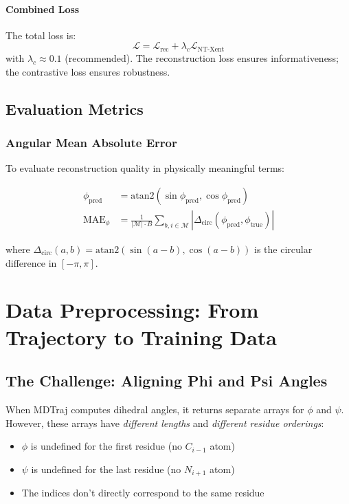 \documentclass[12pt,a4paper]{article}
\begin{document}
\paragraph{Combined Loss}
The total loss is:
\begin{equation}
\mathcal{L} = \mathcal{L}_{\text{rec}} + \lambda_c \mathcal{L}_{\text{NT-Xent}}
\end{equation}
with $\lambda_c \approx 0.1$ (recommended). The reconstruction loss ensures informativeness; the contrastive loss ensures robustness.

\subsection{Evaluation Metrics}

\subsubsection{Angular Mean Absolute Error}
To evaluate reconstruction quality in physically meaningful terms:

\begin{align}
\phi_{\text{pred}} &= \text{atan2}(\sin \phi_{\text{pred}}, \cos \phi_{\text{pred}}) \\
\text{MAE}_\phi &= \frac{1}{|\mathcal{M}| \cdot B} \sum_{b,i \in \mathcal{M}} |\Delta_{\text{circ}}(\phi_{\text{pred}}, \phi_{\text{true}})|
\end{align}

where $\Delta_{\text{circ}}(a, b) = \text{atan2}(\sin(a-b), \cos(a-b))$ is the circular difference in $[-\pi, \pi]$.

\section{Data Preprocessing: From Trajectory to Training Data}

\subsection{The Challenge: Aligning Phi and Psi Angles}

When MDTraj computes dihedral angles, it returns separate arrays for $\phi$ and $\psi$. However, these arrays have \textit{different lengths} and \textit{different residue orderings}:
\begin{itemize}
    \item $\phi$ is undefined for the first residue (no $C_{i-1}$ atom)
    \item $\psi$ is undefined for the last residue (no $N_{i+1}$ atom)
    \item The indices don't directly correspond to the same residue
\end{itemize}
\end{document}
